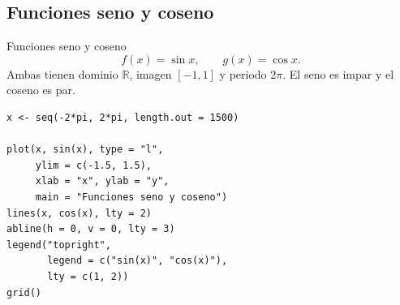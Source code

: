 \documentclass[aspectratio=169,10pt]{beamer}
\newcommand{\R}{\mathbb{R}}
\begin{document}
\subsection*{Funciones seno y coseno}
\begin{frame}{Funciones seno y coseno}
\[
f(x)=\sin x,\qquad g(x)=\cos x.
\]
Ambas tienen dominio $\R$, imagen $[-1,1]$ y periodo $2\pi$. El seno es impar y
el coseno es par.

\begin{center}
\end{center}

\begin{verbatim}
x <- seq(-2*pi, 2*pi, length.out = 1500)

plot(x, sin(x), type = "l",
     ylim = c(-1.5, 1.5),
     xlab = "x", ylab = "y",
     main = "Funciones seno y coseno")
lines(x, cos(x), lty = 2)
abline(h = 0, v = 0, lty = 3)
legend("topright",
       legend = c("sin(x)", "cos(x)"),
       lty = c(1, 2))
grid()
\end{verbatim}

\end{frame}
\end{document}

